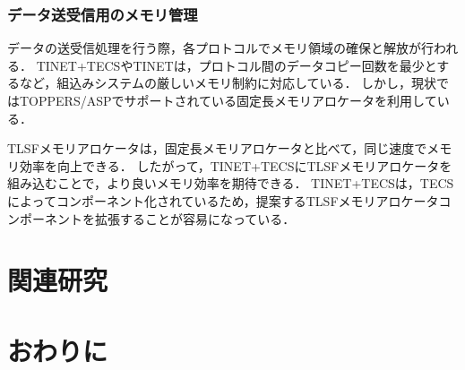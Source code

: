 \documentclass[submit]{ipsj_v2/UTF8/ipsj}
\begin{document}
\subsubsection{データ送受信用のメモリ管理}

データの送受信処理を行う際，各プロトコルでメモリ領域の確保と解放が行われる．
TINET+TECSやTINETは，プロトコル間のデータコピー回数を最少とするなど，組込みシステムの厳しいメモリ制約に対応している．
しかし，現状ではTOPPERS/ASPでサポートされている固定長メモリアロケータを利用している．

TLSFメモリアロケータは，固定長メモリアロケータと比べて，同じ速度でメモリ効率を向上できる．
したがって，TINET+TECSにTLSFメモリアロケータを組み込むことで，より良いメモリ効率を期待できる．
TINET+TECSは，TECSによってコンポーネント化されているため，提案するTLSFメモリアロケータコンポーネントを拡張することが容易になっている．

\section{関連研究}
\label{sec:RelatedWork}

\section{おわりに}
\label{sec:Conclusion}




\end{document}
